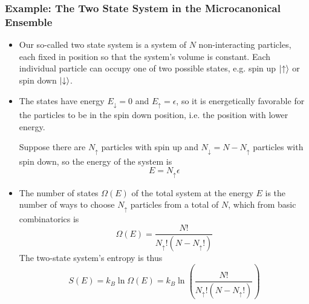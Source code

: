 \documentclass[11pt, a4paper]{article}
\begin{document}
\begin{itemize}
\end{itemize}

\subsubsection{Example: The Two State System in the Microcanonical Ensemble}
\begin{itemize}
	\item Our so-called two state system is a system of $ N $ non-interacting particles, each fixed in position so that the system's volume is constant. Each individual particle can occupy one of two possible states, e.g. spin up $ \ket{\uparrow} $ or spin down $ \ket{\downarrow} $. 
	
	\item The states have energy $ E_{\downarrow} = 0$ and $ E_{\uparrow} = \epsilon $, so it is energetically favorable for the particles to be in the spin down position, i.e. the position with lower energy. 
	
	Suppose there are $ N_{\uparrow} $ particles with spin up and $ N_{\downarrow} = N - N_{\uparrow}$ particles with spin down, so the energy of the system is 
	\begin{equation*}
		E = N_{\uparrow} \epsilon
	\end{equation*}
	
	\item The number of states $ \Omega(E) $ of the total system at the energy $ E $ is the number of ways to choose $ N_{\uparrow} $ particles from a total of $ N $, which from basic combinatorics is 
	\begin{equation*}
		\Omega(E) = \frac{N!}{N_{\uparrow}!(N - N_{\uparrow}!)}
	\end{equation*}
	The two-state system's entropy is thus
	\begin{equation*}
		S(E) = k_{B}\ln \Omega(E) = k_{B} \ln(\frac{N!}{N_{\uparrow}!(N - N_{\uparrow}!)})
	\end{equation*}
	

\end{itemize}
\end{document}
